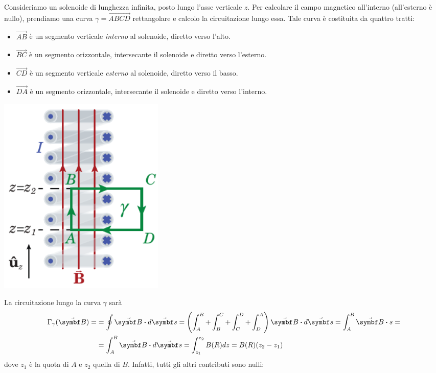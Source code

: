 \begin{examplewt}
	Consideriamo un solenoide di lunghezza infinita, posto lungo l'asse verticale $z$. Per calcolare il campo magnetico all'interno (all'esterno è nullo), prendiamo una curva $\gamma=\overrightarrow{ABCD}$ rettangolare e calcolo la circuitazione lungo essa. Tale curva è costituita da quattro tratti:
	\begin{itemize}
		\item $\overrightarrow{AB}$ è un segmento verticale \textit{interno} al solenoide, diretto verso l'alto.
		\item $\overrightarrow{BC}$ è un segmento orizzontale, intersecante il solenoide e diretto verso l'esterno.
		\item $\overrightarrow{CD}$ è un segmento verticale \textit{esterno} al solenoide, diretto verso il basso.
		\item $\overrightarrow{DA}$ è un segmento orizzontale, intersecante il solenoide e diretto verso l'interno.
	\end{itemize}
	\begin{center}
		\includegraphics[width=0.35\textwidth]{images/chp9/chp9solenoidecircuitazione.pdf}
	\end{center}
	La circuitazione lungo la curva $\gamma$ sarà
	\begin{align*}
		\Gamma_{\gamma}(\vba{B})=&=\oint\vba{B}\vdot d\vba{s}=\left( \int_A^B + \int_B^C + \int_C^D + \int_D^A  \right) \vba{B}\vdot d\vba s= \int^B_A \vba{B}\vdot s=\\
		&=\int_{A}^{B}\vba{B}\vdot d\vba{s}=\int^{z_2}_{z_1} B(R)dz=B(R)(z_2-z_1)
	\end{align*}
	dove $z_1$ è la quota di $A$ e $z_2$ quella di $B$. Infatti, tutti gli altri contributi sono nulli:

\end{examplewt}
